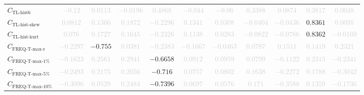 \documentclass{standalone}
\newcommand{\tlhistsixname}{\text{TL-hist6}}
\newcommand{\tlhistsix}{C_{\tlhistsixname}}
\newcommand{\tlskewhistname}{\text{TL-hist-skew}}
\newcommand{\tlskewhist}{C_{\tlskewhistname}}
\newcommand{\tlkurthistname}{\text{TL-hist-kurt}}
\newcommand{\tlkurthist}{C_{\tlkurthistname}}
\newcommand{\freqmaxrname}{\text{FREQ-T-max-r}}
\newcommand{\freqmaxr}{C_{\freqmaxrname}}
\newcommand{\freqmaxonename}{\text{FREQ-T-max-1\%}}
\newcommand{\freqmaxone}{C_{\freqmaxonename}}
\newcommand{\freqmaxfivename}{\text{FREQ-T-max-5\%}}
\newcommand{\freqmaxfive}{C_{\freqmaxfivename}}
\newcommand{\freqmaxtenname}{\text{FREQ-T-max-10\%}}
\newcommand{\freqmaxten}{C_{\freqmaxtenname}}
\begin{document}
\begin{tabular}{lcccccccccc}
$\tlhistsix$ & \textcolor{lightgray}{$-0.12$} & \textcolor{lightgray}{$0.0113$} & \textcolor{lightgray}{$-0.0196$} & \textcolor{lightgray}{$0.4868$} & \textcolor{lightgray}{$-0.044$} & \textcolor{lightgray}{$-0.06$} & \textcolor{lightgray}{$0.3388$} & \textcolor{lightgray}{$0.0874$} & \textcolor{lightgray}{$0.3817$} & \textcolor{lightgray}{$0.0048$} \\ 
$\tlskewhist$ & \textcolor{lightgray}{$0.0812$} & \textcolor{lightgray}{$0.1366$} & \textcolor{lightgray}{$0.1872$} & \textcolor{lightgray}{$-0.2296$} & \textcolor{lightgray}{$0.1341$} & \textcolor{lightgray}{$0.0308$} & \textcolor{lightgray}{$-0.0404$} & \textcolor{lightgray}{$-0.0436$} & $0.8361$ & \textcolor{lightgray}{$0.0095$} \\ 
$\tlkurthist$ & \textcolor{lightgray}{$0.076$} & \textcolor{lightgray}{$0.1727$} & \textcolor{lightgray}{$0.1645$} & \textcolor{lightgray}{$-0.2326$} & \textcolor{lightgray}{$0.1138$} & \textcolor{lightgray}{$0.0283$} & \textcolor{lightgray}{$-0.0822$} & \textcolor{lightgray}{$-0.0786$} & $0.8362$ & \textcolor{lightgray}{$-0.0169$} \\ 
$\freqmaxr$ & \textcolor{lightgray}{$-0.2297$} & $-0.755$ & \textcolor{lightgray}{$0.0381$} & \textcolor{lightgray}{$-0.2383$} & \textcolor{lightgray}{$-0.1667$} & \textcolor{lightgray}{$-0.0463$} & \textcolor{lightgray}{$0.0787$} & \textcolor{lightgray}{$0.1511$} & \textcolor{lightgray}{$0.1419$} & \textcolor{lightgray}{$0.2321$} \\ 
$\freqmaxone$ & \textcolor{lightgray}{$-0.1623$} & \textcolor{lightgray}{$0.2561$} & \textcolor{lightgray}{$0.2941$} & $-0.6658$ & \textcolor{lightgray}{$0.0912$} & \textcolor{lightgray}{$0.0959$} & \textcolor{lightgray}{$0.0799$} & \textcolor{lightgray}{$-0.1122$} & \textcolor{lightgray}{$0.2315$} & \textcolor{lightgray}{$-0.2341$} \\ 
$\freqmaxfive$ & \textcolor{lightgray}{$-0.2493$} & \textcolor{lightgray}{$0.2175$} & \textcolor{lightgray}{$0.2056$} & $-0.716$ & \textcolor{lightgray}{$0.0757$} & \textcolor{lightgray}{$0.0802$} & \textcolor{lightgray}{$0.1638$} & \textcolor{lightgray}{$-0.2272$} & \textcolor{lightgray}{$0.1788$} & \textcolor{lightgray}{$-0.3042$} \\ 
$\freqmaxten$ & \textcolor{lightgray}{$-0.3096$} & \textcolor{lightgray}{$0.0529$} & \textcolor{lightgray}{$0.2484$} & $-0.7396$ & \textcolor{lightgray}{$0.0697$} & \textcolor{lightgray}{$0.0576$} & \textcolor{lightgray}{$0.171$} & \textcolor{lightgray}{$-0.3588$} & \textcolor{lightgray}{$0.1359$} & \textcolor{lightgray}{$-0.1736$} \\ 

\end{tabular}
\end{document}
